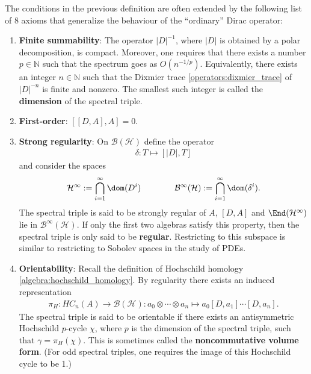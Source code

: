     \begin{remark}
        The conditions in the previous definition are often extended by the following list of 8 axioms that generalize the behaviour of the ``ordinary'' Dirac operator:
        \begin{enumerate}
            \item\textbf{Finite summability}: The operator $|D|^{-1}$, where $|D|$ is obtained by a polar decomposition, is compact. Moreover, one requires that there exists a number $p\in\mathbb{N}$ such that the spectrum goes as $O(n^{-1/p})$. Equivalently, there exists an integer $n\in\mathbb{N}$ such that the Dixmier trace \ref{operators:dixmier_trace} of $|D|^{-n}$ is finite and nonzero. The smallest such integer is called the \textbf{dimension} of the spectral triple.
            \item\textbf{First-order}: $[[D,A],A]=0$.
            \item\textbf{Strong regularity}: On $\mathcal{B}(\mathcal{H})$ define the operator
            \begin{gather}
                \delta:T\mapsto[|D|,T]
            \end{gather}
            and consider the spaces
            \begin{gather}
                \mathcal{H}^\infty:=\bigcap_{i=1}^\infty\dom(D^i)\qquad\qquad\mathcal{B}^\infty(\mathcal{H}):=\bigcap_{i=1}^\infty\dom(\delta^i).
            \end{gather}
            The spectral triple is said to be strongly regular of $A$, $[D,A]$ and $\End(\mathcal{H}^\infty)$ lie in $\mathcal{B}^\infty(\mathcal{H})$. If only the first two algebras satisfy this property, then the spectral triple is only said to be \textbf{regular}. Restricting to this subspace is similar to restricting to Sobolev spaces in the study of PDEs.
            \item\textbf{Orientability}: Recall the definition of Hochschild homology \ref{algebra:hochschild_homology}. By regularity there exists an induced representation
            \begin{gather}
                \pi_H:HC_n(A)\rightarrow\mathcal{B}(\mathcal{H}):a_0\otimes\cdots\otimes a_n\mapsto a_0[D,a_1]\cdots[D,a_n].
            \end{gather}
            The spectral triple is said to be orientable if there exists an antisymmetric Hochschild $p$-cycle $\chi$, where $p$ is the dimension of the spectral triple, such that $\gamma=\pi_H(\chi)$. This is sometimes called the \textbf{noncommutative volume form}. (For odd spectral triples, one requires the image of this Hochschild cycle to be 1.)

\end{enumerate}
\end{remark}
